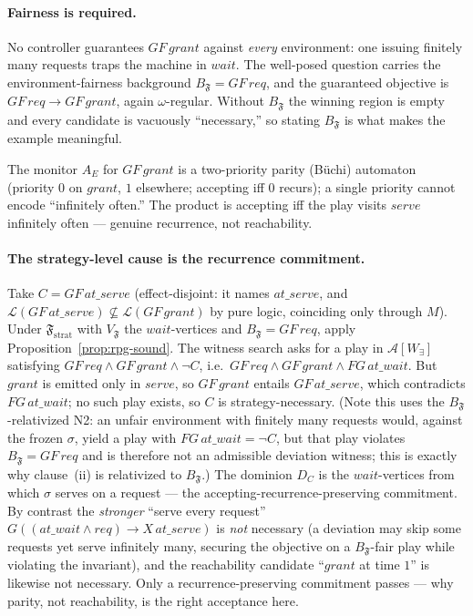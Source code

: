\documentclass[11pt]{article}
\theoremstyle{remark}
\newcommand{\Lang}{\mathcal{L}}
\newcommand{\Frame}{\mathfrak{F}}
\begin{document}
\paragraph{Fairness is required.} No controller guarantees \(GF\,grant\) against
\emph{every} environment: one issuing finitely many requests traps the machine in
\(\mathit{wait}\). The well-posed question carries the environment-fairness background
\(B_{\Frame}=GF\,req\), and the guaranteed objective is \(GF\,req\rightarrow
GF\,grant\), again \(\omega\)-regular. Without \(B_{\Frame}\) the winning region is
empty and every candidate is vacuously ``necessary,'' so stating \(B_{\Frame}\) is
what makes the example meaningful.

The monitor \(A_E\) for \(GF\,grant\) is a two-priority parity (Büchi) automaton
(priority \(0\) on \(grant\), \(1\) elsewhere; accepting iff \(0\) recurs); a
single priority cannot encode ``infinitely often.'' The product is accepting iff
the play visits \(\mathit{serve}\) infinitely often --- genuine recurrence, not
reachability.

\paragraph{The strategy-level cause is the recurrence commitment.} Take
\(C=GF\,\mathit{at\_serve}\) (effect-disjoint: it names \(\mathit{at\_serve}\), and
\(\Lang(GF\,\mathit{at\_serve})\not\subseteq\Lang(GF\,grant)\) by pure logic,
coinciding only through \(M\)). Under \(\Frame_{\mathrm{strat}}\) with
\(V_{\Frame}\) the \(\mathit{wait}\)-vertices and \(B_{\Frame}=GF\,req\), apply
Proposition~\ref{prop:rpg-sound}. The witness search asks for a play in
\(\mathcal{A}[W_\exists]\) satisfying \(GF\,req\wedge GF\,grant\wedge\neg C\),
i.e.\ \(GF\,req\wedge GF\,grant\wedge FG\,\mathit{at\_wait}\). But \(grant\) is
emitted only in \(\mathit{serve}\), so \(GF\,grant\) entails \(GF\,\mathit{at\_serve}\),
which contradicts \(FG\,\mathit{at\_wait}\); no such play exists, so \(C\) is
strategy-necessary. (Note this uses the \(B_{\Frame}\)-relativized N2: an unfair
environment with finitely many requests would, against the frozen \(\sigma\),
yield a play with \(FG\,\mathit{at\_wait}=\neg C\), but that play violates
\(B_{\Frame}=GF\,req\) and is therefore not an admissible deviation witness; this
is exactly why clause~(ii) is relativized to \(B_{\Frame}\).) The dominion \(D_C\)
is the \(\mathit{wait}\)-vertices from which \(\sigma\) serves on a request --- the
accepting-recurrence-preserving commitment. By contrast the \emph{stronger} ``serve
every request'' \(G((\mathit{at\_wait}\land req)\to X\,\mathit{at\_serve})\) is
\emph{not} necessary (a deviation may skip some requests yet serve infinitely
many, securing the objective on a \(B_{\Frame}\)-fair play while violating the
invariant), and the reachability candidate ``\(grant\) at time \(1\)'' is likewise
not necessary. Only a recurrence-preserving commitment passes --- why parity, not
reachability, is the right acceptance here.
\end{document}

